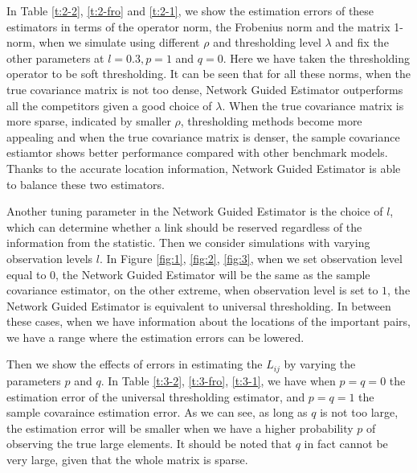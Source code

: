 In Table \ref{t:2-2}, \ref{t:2-fro} and \ref{t:2-1}, we show the estimation errors of these estimators in terms of the operator norm, the Frobenius norm and the matrix 1-norm, when we simulate using different \(\rho\) and thresholding level \(\lambda\) and fix the other parameters at \(l = 0.3, p = 1\) and \(q =0\). Here we have taken the thresholding operator to be soft thresholding. It can be seen that for all these norms, when the true covariance matrix is not too dense, Network Guided Estimator outperforms all the competitors given a good choice of $\lambda$. When the true covariance matrix is more sparse, indicated by smaller $\rho$, thresholding methods become more appealing and when the true covariance matrix is denser, the sample covariance estiamtor shows better performance compared with other benchmark models. Thanks to the accurate location information, Network Guided Estimator is able to balance these two estimators.  


Another tuning parameter in the Network Guided Estimator is the choice of $l$, which can determine whether a link should be reserved regardless of the information from the statistic. Then we consider simulations with varying observation levels \(l\). In Figure \ref{fig:1}, \ref{fig:2}, \ref{fig:3}, 
when we set observation level equal to \(0\), the Network Guided Estimator will be the same as the sample covariance estimator, on the other extreme, when observation level is set to \(1\), the Network Guided Estimator is equivalent to universal thresholding. In between these cases, when we have information about the locations of the important pairs, we have a range where the estimation errors can be lowered. 

Then we show the effects of errors in estimating the \(L_{ij}\) by varying the parameters \(p\) and \(q\). In Table \ref{t:3-2}, \ref{t:3-fro}, \ref{t:3-1}, we have when \(p = q = 0\) the estimation error of the universal thresholding estimator, and \(p =q =1\) the sample covaraince estimation error. As we can see, as long as \(q\) is not too large, the estimation error will be smaller when we have a higher probability \(p\) of observing the true large elements. It should be noted that \(q\) in fact cannot be very large, given that the whole matrix is sparse. 